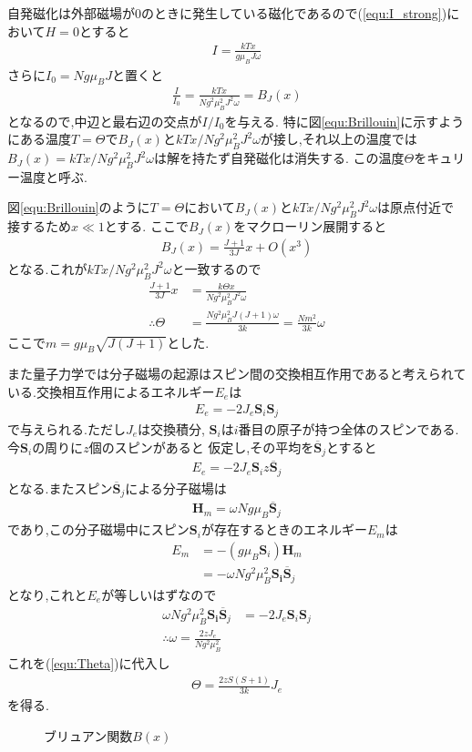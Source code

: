 自発磁化は外部磁場が$0$のときに発生している磁化であるので(\ref{equ:I_strong})において$H=0$とすると
\begin{align}
  I=\frac{kTx}{g\mu_BJ\omega}
\end{align}
さらに$I_0=Ng\mu_BJ$と置くと
\begin{align}
  \frac{I}{I_0}=\frac{kTx}{Ng^2\mu_B^2J^2\omega}=B_J(x)
\end{align}
となるので,中辺と最右辺の交点が$I/I_0$を与える.
特に図\ref{equ:Brillouin}に示すようにある温度$T=\Theta$で$B_J(x)$と$kTx/Ng^2\mu_B^2J^2\omega$が接し,それ以上の温度では$B_J(x)=kTx/Ng^2\mu_B^2J^2\omega$は解を持たず自発磁化は消失する.
この温度$\Theta$をキュリー温度と呼ぶ.

図\ref{equ:Brillouin}のように$T=\Theta$において$B_J(x)$と$kTx/Ng^2\mu_B^2J^2\omega$は原点付近で接するため$x\ll 1$とする.
ここで$B_J(x)$をマクローリン展開すると
\begin{align}
  B_J(x)=\frac{J+1}{3J}x+O(x^3)
\end{align}
となる.これが$kTx/Ng^2\mu_B^2J^2\omega$と一致するので
\begin{align}
  \label{equ:Theta}
  \frac{J+1}{3J}x&=\frac{k\Theta x}{Ng^2\mu_B^2J^2\omega}\nonumber\\
  \therefore \Theta&=\frac{Ng^2\mu_B^2J(J+1)\omega}{3k}=\frac{Nm^2}{3k}\omega
\end{align}
ここで$m=g\mu_B\sqrt{J(J+1)}$とした.

また量子力学では分子磁場の起源はスピン間の交換相互作用であると考えられている.交換相互作用によるエネルギー$E_e$は
\begin{align}
  E_e=-2J_e\bm{S}_i\bm{S}_j
\end{align}
で与えられる.ただし$J_e$は交換積分, $\bm{S}_i$は$i$番目の原子が持つ全体のスピンである.今$\bm{S}_i$の周りに$z$個のスピンがあると
仮定し,その平均を$\overline{\bm{S}}_j$とすると
\begin{align}
  E_e=-2J_e\bm{S}_iz\overline{\bm{S}}_j
\end{align}
となる.またスピン$\overline{\bm{S}}_j$による分子磁場は
\begin{align}
  \bm{H}_m=\omega Ng\mu_B\overline{{\bm{S}}}_j
\end{align}
であり,この分子磁場中にスピン$\bm{S}_i$が存在するときのエネルギー$E_m$は
\begin{align}
  E_m&=-(g\mu_B\bm{S}_i)\bm{H}_m\nonumber\\
  &=-\omega Ng^2\mu_B^2\bm{S_i}\overline{\bm{S}}_j
\end{align}
となり,これと$E_e$が等しいはずなので
\begin{align}
  \omega Ng^2\mu_B^2\bm{S_i}\overline{\bm{S}}_j&=-2J_e\bm{S}_i\bm{S}_j\\
  \therefore \omega=\frac{2zJ_e}{Ng^2\mu_B^2}
\end{align}
これを(\ref{equ:Theta})に代入し
\begin{align}
  \Theta=\frac{2zS(S+1)}{3k}J_e
\end{align}
を得る.

\begin{figure}[hptb]
  \begin{center}
    
    \caption{ブリュアン関数$B(x)$}
    \label{fig:Brillouin}
  \end{center}
\end{figure}